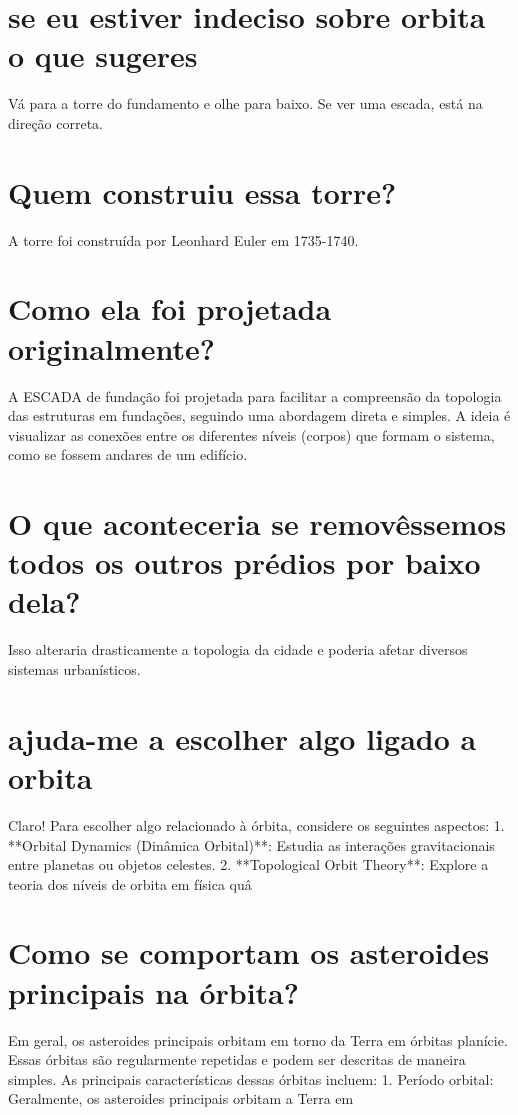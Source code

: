 \documentclass[11pt,a4paper]{article}
\begin{document}
\section{se eu estiver indeciso sobre orbita o que sugeres}
Vá para a torre do fundamento e olhe para baixo. Se ver uma escada, está na direção correta.

\section{Quem construiu essa torre?}
A torre foi construída por Leonhard Euler em 1735-1740.

\section{Como ela foi projetada originalmente?}
A ESCADA de fundação foi projetada para facilitar a compreensão da topologia das estruturas em fundações, seguindo uma abordagem direta e simples. A ideia é visualizar as conexões entre os diferentes níveis (corpos) que formam o sistema, como se fossem andares de um edifício.

\section{O que aconteceria se removêssemos todos os outros prédios por baixo dela?}
Isso alteraria drasticamente a topologia da cidade e poderia afetar diversos sistemas urbanísticos.

\section{ajuda-me a escolher algo ligado a orbita}
Claro! Para escolher algo relacionado à órbita, considere os seguintes aspectos: 1. **Orbital Dynamics (Dinâmica Orbital)**: Estudia as interações gravitacionais entre planetas ou objetos celestes. 2. **Topological Orbit Theory**: Explore a teoria dos níveis de orbita em física quâ

\section{Como se comportam os asteroides principais na órbita?}
Em geral, os asteroides principais orbitam em torno da Terra em órbitas planície. Essas órbitas são regularmente repetidas e podem ser descritas de maneira simples. As principais características dessas órbitas incluem: 1. Período orbital: Geralmente, os asteroides principais orbitam a Terra em
\end{document}
